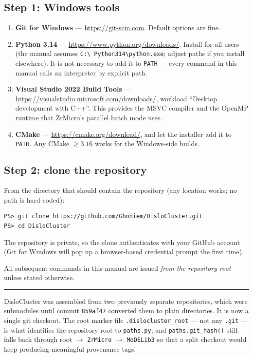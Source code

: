 \documentclass[11pt]{article}
\newcommand{\ZrM}{\textsf{ZrMicro}}
\newcommand{\DC}{\textsf{DisloCluster}}
\newcommand{\code}[1]{\texttt{\small #1}}
\newcommand{\file}[1]{\texttt{\footnotesize #1}}
\newenvironment{notebox}
  {\par\medskip\noindent
   \begin{minipage}{\textwidth}
   {\color{blue!50!black}\rule{\textwidth}{0.8pt}}\par\smallskip
   \small\noindent{\color{blue!50!black}\textbf{Note.}}\space}
  {\par\smallskip\noindent{\color{blue!50!black}\rule{\textwidth}{0.8pt}}
   \end{minipage}\par\medskip}
\begin{document}
\subsection{Step 1: Windows tools}

\begin{enumerate}
\item \textbf{Git for Windows} --- \url{https://git-scm.com}. Default options
are fine.
\item \textbf{Python 3.14} --- \url{https://www.python.org/downloads/}.
Install for all users (the manual assumes \file{C:\textbackslash
Python314\textbackslash python.exe}; adjust paths if you install elsewhere).
It is not necessary to add it to \code{PATH} --- every command in this manual
calls an interpreter by explicit path.
\item \textbf{Visual Studio 2022 Build Tools} ---
\url{https://visualstudio.microsoft.com/downloads/}, workload
``Desktop development with C++''. This provides the MSVC compiler and the
OpenMP runtime that \ZrM{}'s parallel batch mode uses.
\item \textbf{CMake} --- \url{https://cmake.org/download/}, and let the
installer add it to \code{PATH}. Any CMake $\ge 3.16$ works for the
Windows-side builds.
\end{enumerate}

\subsection{Step 2: clone the repository}

From the directory that should contain the repository (any location works;
no path is hard-coded):

\begin{lstlisting}[style=ps]
PS> git clone https://github.com/Ghoniem/DisloCluster.git
PS> cd DisloCluster
\end{lstlisting}

The repository is private, so the clone authenticates with your GitHub
account (Git for Windows will pop up a browser-based credential prompt the
first time).

All subsequent commands in this manual are issued \emph{from the repository
root} unless stated otherwise.

\begin{notebox}
\DC{} was assembled from two previously separate repositories, which were
submodules until commit \code{859af47} converted them to plain directories.
It is now a single git checkout. The root marker file
\file{.dislocluster\_root} --- not any \file{.git} --- is what identifies the
repository root to \file{paths.py}, and \code{paths.git\_hash()} still falls
back through root $\rightarrow$ \file{ZrMicro} $\rightarrow$ \file{MoDELib3}
so that a split checkout would keep producing meaningful provenance tags.
\end{notebox}
\end{document}

